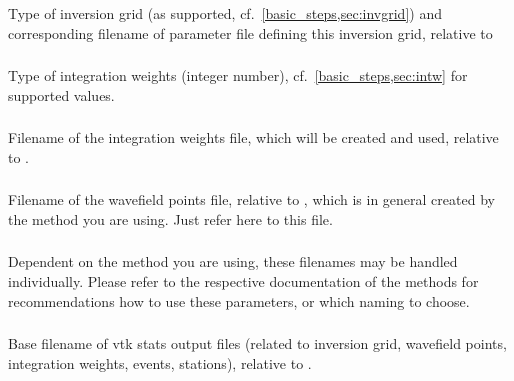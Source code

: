 \subsubsection{} \label{files,sec:iter_parfile,itm:invgrid}
Type of inversion grid (as supported, cf.\ \ref{basic_steps,sec:invgrid}) and corresponding
filename of parameter file defining this inversion grid, relative to \\
\subsubsection{}
Type of integration weights (integer number), cf.\ \ref{basic_steps,sec:intw} for supported values.
\subsubsection{} 
Filename of the integration weights file, which will be created and used, relative to 
. 
\subsubsection{} 
Filename of the wavefield points file, relative to , which
is in general created by the method you are using. Just refer here to this file. 
\subsubsection{} \label{files,sec:iter_parfile,itm:model}
Dependent on the method you are using, these filenames may be handled individually. Please refer to the respective 
documentation of the methods for recommendations how to use these parameters, or which naming to choose.
\subsubsection{}
Base filename of vtk stats output files (related to inversion grid, wavefield points, integration weights,
events, stations), relative to . 
